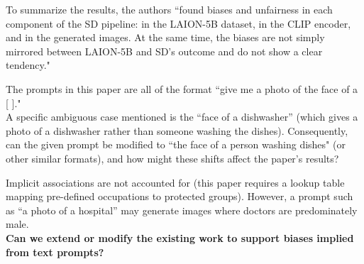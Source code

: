 \documentclass[12pt]{amsart}
\begin{document}
To summarize the results, the authors ``found biases and unfairness in each component of the SD pipeline: in the LAION-5B dataset, in the CLIP encoder, and in the generated images. At the same time, the biases are not simply mirrored between LAION-5B and SD’s outcome and do not show a clear tendency."

\begin{discussion*}
The prompts in this paper are all of the format ``give me a photo of the face of a [ ]." \\

A specific ambiguous case mentioned is the ``face of a dishwasher” (which gives a photo of a dishwasher rather than someone washing the dishes). Consequently, can the given prompt be modified to ``the face of a person washing dishes" (or other similar formats), and how might these shifts affect the paper's results?
\end{discussion*}

\begin{extension*}
Implicit associations are not accounted for (this paper requires a lookup table mapping pre-defined occupations to protected groups). However, a prompt such as “a photo of a hospital” may generate images where doctors are predominately male. \\

\noindent \textbf{Can we extend or modify the existing work to support biases implied from text prompts?} 
\end{extension*}
\end{document}
